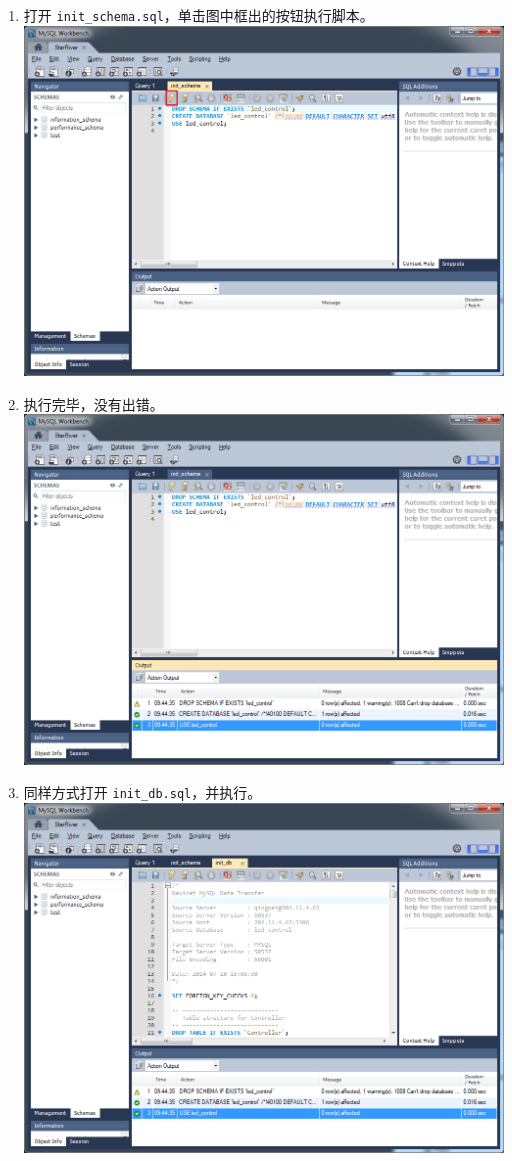 \begin{enumerate}
\item
  打开 \texttt{init\_schema.sql}，单击图中框出的按钮执行脚本。
  \includegraphics{../img/db_init_7.png}
\item
  执行完毕，没有出错。 \includegraphics{../img/db_init_8.png}
\item
  同样方式打开 \texttt{init\_db.sql}，并执行。
  \includegraphics{../img/db_init_9.png}

\end{enumerate}
